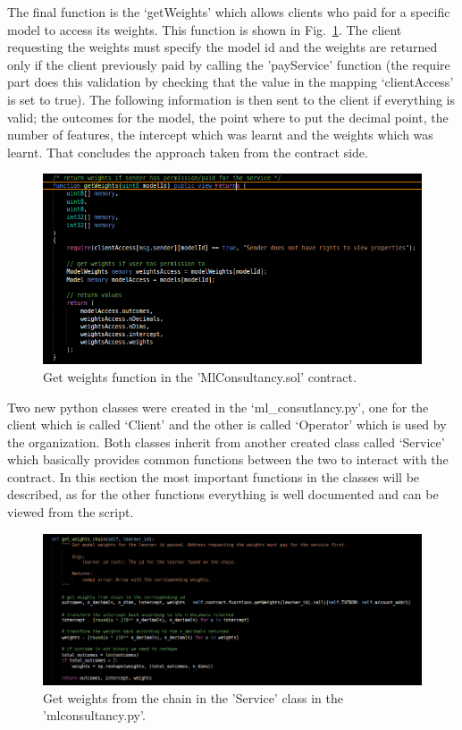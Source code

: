 \noindent
The final function is the ‘getWeights’ which allows clients who paid for a specific model to access its weights. This function is shown in Fig.~\ref{fig:model_sol_8}. The client requesting the weights must specify the model id and the weights are returned only if the client previously paid by calling the ’payService’ function (the require part does this validation by checking that the value in the mapping ‘clientAccess’ is set to true). The following information is then sent to the client if everything is valid; the outcomes for the model, the point where to put the decimal point, the number of features, the intercept which was learnt and the weights which was learnt. That concludes the approach taken from the contract side.             

\begin{figure}[H]
\centering
  \includegraphics[scale = .75]{imgs/model_sol_8.png}
  \caption{Get weights function in the 'MlConsultancy.sol' contract.}
  \label{fig:model_sol_8}
\end{figure}

\noindent
Two new python classes were created in the ‘ml\_consutlancy.py’, one for the client which is called ‘Client’ and the other is called ‘Operator’ which is used by the organization. Both classes inherit from another created class called ‘Service’ which basically provides common functions between the two to interact with the contract. In this section the most important functions in the classes will be described, as for the other functions everything is well documented and can be viewed from the script. 

\begin{figure}[H]
\centering
  \includegraphics[scale = .55]{imgs/model_sol_py_1.png}
  \caption{Get weights from the chain in the 'Service' class in the 'mlconsultancy.py'.}
  \label{fig:model_sol_py_1}
\end{figure}

